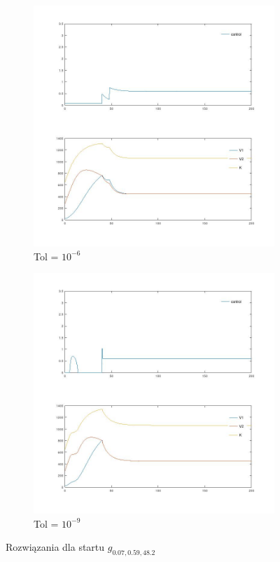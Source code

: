 \documentclass[11pt]{article}
\begin{document}
\begin{figure}[h]
  \begin{subfigure}{.5\textwidth}
    \includegraphics[width=\textwidth]{../plots/p_comp_6}
    \caption{Tol = $10^{-6}$}\label{p_comp_6}
  \end{subfigure}
  \begin{subfigure}{.5\textwidth}
    \includegraphics[width=\textwidth]{../plots/p_comp_9}
    \caption{Tol = $10^{-9}$}\label{p_comp_9}
  \end{subfigure}%
  \caption{Rozwiązania dla startu $g_{0.07,0.59,48.2}$}\label{test_gcomp_sol}
\end{figure}
\end{document}
